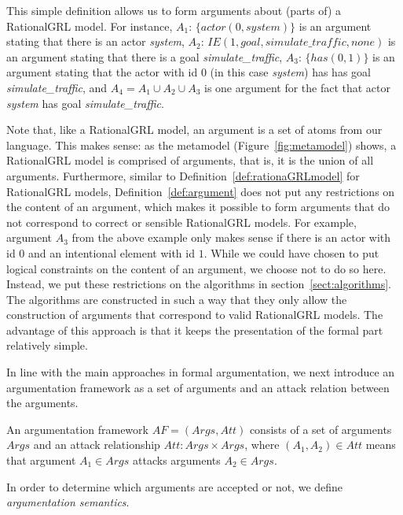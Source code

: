 This simple definition allows us to form arguments about (parts of) a RationalGRL model. For instance, $A_1$: $\{actor(0,system)\}$ is an argument stating that there is an actor \emph{system}, $A_2$: $IE(1,goal,simulate\_traffic,none)$ is an argument stating that there is a goal \emph{simulate\_traffic}, $A_3$: $\{has(0,1)\}$ is an argument stating that the actor with id $0$ (in this case \emph{system}) has has goal \emph{simulate\_traffic}, and $A_4 = A_1 \cup A_2 \cup A_3$ is one argument for the fact that actor \emph{system} has goal \emph{simulate\_traffic}. 

Note that, like a RationalGRL model, an argument is a set of atoms from our language. This makes sense: as the metamodel (Figure~\ref{fig:metamodel}) shows, a RationalGRL model is comprised of arguments, that is, it is the union of all arguments. Furthermore, similar to Definition~\ref{def:rationaGRLmodel} for RationalGRL models, Definition~\ref{def:argument} does not put any restrictions on the content of an argument, which makes it possible to form arguments that do not correspond to correct or sensible RationalGRL models. For example, argument $A_3$ from the above example only makes sense if there is an actor with id $0$ and an intentional element with id $1$. While we could have chosen to put logical constraints on the content of an argument, we choose not to do so here. Instead, we put these restrictions on the algorithms in section~\ref{sect:algorithms}. The algorithms are constructed in such a way that they only allow the construction of arguments that correspond to valid RationalGRL models. The advantage of this approach is that it keeps the presentation of the formal part relatively simple.

In line with the main approaches in formal argumentation, we next introduce an argumentation framework as a set of arguments and an attack relation between the arguments.

\begin{definition} \label{def:argumentationframework}
An argumentation framework $AF=(Args,Att)$ consists of a set of arguments $Args$ and an attack relationship $Att:Args\times Args$, where $(A_1,A_2)\in Att$ means that argument $A_1\in Args$ attacks arguments $A_2\in Args$.
\end{definition}

In order to determine which arguments are accepted or not, we define \emph{argumentation semantics}. 

